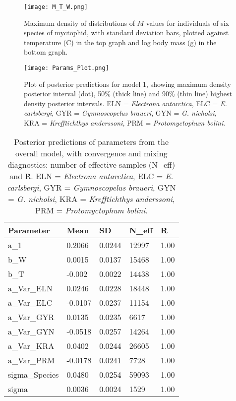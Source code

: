 \documentclass[12pt, titlepage]{article}
\begin{document}
\begin{figure}[H]
\texttt{[image: M\_T\_W.png]}
\caption{Maximum density of distributions of $M$ values for individuals of six species of myctophid, with standard deviation bars, plotted against temperature (\textdegree C) in the top graph and log body mass (g) in the bottom graph. } %
\end{figure}

\begin{figure}[H]
\texttt{[image: Params\_Plot.png]}
\caption{Plot of posterior predictions for model 1, showing maximum density posterior interval (dot), 50\% (thick line) and 90\% (thin line) highest density posterior intervals. ELN = \textit{Electrona antarctica}, ELC = \textit{E. carlsbergi}, GYR = \textit{Gymnoscopelus braueri}, GYN = \textit{G. nicholsi}, KRA = \textit{Krefftichthys anderssoni}, PRM = \textit{Protomyctophum bolini}.}
\end{figure}

\begin{table}
\begin{center}
\caption{Posterior predictions of parameters from the overall model, with convergence and mixing diagnostics: number of effective samples (N\_eff) and \^R. ELN = \textit{Electrona antarctica}, ELC = \textit{E. carlsbergi}, GYR = \textit{Gymnoscopelus braueri}, GYN = \textit{G. nicholsi}, KRA = \textit{Krefftichthys anderssoni}, PRM = \textit{Protomyctophum bolini}.}

\def\arraystretch{1.5}
  \begin{tabular}{ | l | l | l | l | l |}
    \hline
    \textbf{Parameter} & Mean & SD & N\_eff & \^R \\ \hline
    a\_1 & 0.2066 & 0.0244 & 12997 & 1.00 \\ \hline
    b\_W & 0.0015 & 0.0137 & 15468 & 1.00\\ \hline
    b\_T & -0.002 & 0.0022 & 14438 & 1.00 \\ \hline
    a\_Var\_ELN & 0.0246 & 0.0228 & 18448 & 1.00 \\ \hline
    a\_Var\_ELC & -0.0107 & 0.0237 & 11154 & 1.00 \\ \hline
    a\_Var\_GYR & 0.0135 & 0.0235 & 6617 & 1.00 \\ \hline
    a\_Var\_GYN & -0.0518 & 0.0257 & 14264 & 1.00 \\ \hline
    a\_Var\_KRA & 0.0402 & 0.0244 & 26605 & 1.00 \\ \hline
    a\_Var\_PRM & -0.0178 & 0.0241 & 7728 & 1.00 \\ \hline
    sigma\_Species & 0.0480 & 0.0254 & 59093 & 1.00 \\ \hline
    sigma & 0.0036 & 0.0024 & 1529 & 1.00 \\
    \hline
  \end{tabular}
  \end{center}
\end{table}
\end{document}
